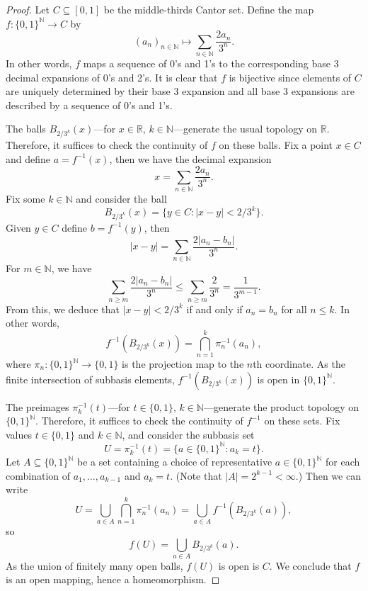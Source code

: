 \documentclass[12pt]{article}
\theoremstyle{definition}
\newcommand{\N}{\mathbb{N}}
\newcommand{\R}{\mathbb{R}}
\newcommand{\<}{\langle}
\renewcommand{\>}{\rangle}
\begin{document}
\begin{proof}
    Let $C \subseteq [0, 1]$ be the middle-thirds Cantor set. Define the map $f : \{0, 1\}^\N \to C$ by
    \[
        (a_n)_{n \in \N} \longmapsto \sum_{n \in \N} \frac{2a_n}{3^n}.
    \]
    In other words, $f$ maps a sequence of 0's and 1's to the corresponding base 3 decimal expansions of 0's and 2's.
    It is clear that $f$ is bijective since elements of $C$ are uniquely determined by their base 3 expansion and all base 3 expansions are described by a sequence of 0's and 1's.
    
    The balls $B_{2/3^k}(x)$---for $x \in \R$, $k \in \N$---generate the usual topology on $\R$.
    Therefore, it suffices to check the continuity of $f$ on these balls. Fix a point $x \in C$ and define $a = f^{-1}(x)$, then we have the decimal expansion
    \[
        x = \sum_{n \in \N} \frac{2a_n}{3^n}.
    \]
    Fix some $k \in \N$ and consider the ball
    \[
        B_{2/3^k}(x) = \{y \in C : |x - y| < 2/3^k\}.
    \]
    Given $y \in C$ define $b = f^{-1}(y)$, then
    \[
        |x - y| = \sum_{n \in \N} \frac{2|a_n - b_n|}{3^n}.
    \]
    For $m \in \N$, we have
    \[
        \sum_{n \geq m} \frac{2|a_n - b_n|}{3^n}
            \leq \sum_{n \geq m} \frac{2}{3^n}
            = \frac{1}{3^{m-1}}.
    \]
    From this, we deduce that $|x - y| < 2/3^k$ if and only if $a_n = b_n$ for all $n \leq k$. In other words,
    \[
        f^{-1}(B_{2/3^k}(x)) = \bigcap_{n = 1}^{k} \pi_n^{-1}(a_n),
    \]
    where $\pi_n : \{0, 1\}^\N \to \{0, 1\}$ is the projection map to the $n$th coordinate. As the finite intersection of subbasis elements, $f^{-1}(B_{2/3^k}(x))$ is open in $\{0, 1\}^\N$.


    The preimages $\pi_k^{-1}(t)$---for $t \in \{0, 1\}$, $k \in \N$---generate the product topology on $\{0, 1\}^\N$. Therefore, it suffices to check the continuity of $f^{-1}$ on these sets. Fix values $t \in \{0, 1\}$ and $k \in \N$, and consider the subbasis set
    \[
        U = \pi_k^{-1}(t) = \{a \in \{0, 1\}^\N : a_k = t\}.
    \]
    Let $A \subseteq \{0, 1\}^\N$ be a set containing a choice of representative $a \in \{0, 1\}^\N$ for each combination of $a_1, \dots, a_{k-1}$ and $a_k = t$. (Note that $|A| = 2^{k-1} < \infty$.) Then we can write
    \[
        U 
            = \bigcup_{a \in A} \bigcap_{n=1}^{k} \pi_n^{-1}(a_n)
            = \bigcup_{a \in A} f^{-1}(B_{2/3^k}(a)),
    \]
    so
    \[
        f(U) = \bigcup_{a \in A} B_{2/3^k}(a).
    \]
    As the union of finitely many open balls, $f(U)$ is open is $C$. We conclude that $f$ is an open mapping, hence a homeomorphism.
\end{proof}
\end{document}
